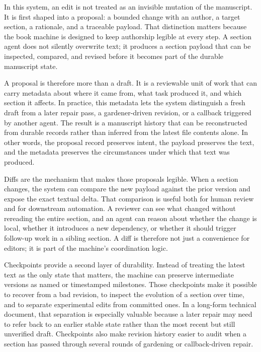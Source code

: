 In this system, an edit is not treated as an invisible mutation of the manuscript. It is first shaped into a proposal: a bounded change with an author, a target section, a rationale, and a traceable payload. That distinction matters because the book machine is designed to keep authorship legible at every step. A section agent does not silently overwrite text; it produces a section payload that can be inspected, compared, and revised before it becomes part of the durable manuscript state.

A proposal is therefore more than a draft. It is a reviewable unit of work that can carry metadata about where it came from, what task produced it, and which section it affects. In practice, this metadata lets the system distinguish a fresh draft from a later repair pass, a gardener-driven revision, or a callback triggered by another agent. The result is a manuscript history that can be reconstructed from durable records rather than inferred from the latest file contents alone. In other words, the proposal record preserves intent, the payload preserves the text, and the metadata preserves the circumstances under which that text was produced.

Diffs are the mechanism that makes those proposals legible. When a section changes, the system can compare the new payload against the prior version and expose the exact textual delta. That comparison is useful both for human review and for downstream automation. A reviewer can see what changed without rereading the entire section, and an agent can reason about whether the change is local, whether it introduces a new dependency, or whether it should trigger follow-up work in a sibling section. A diff is therefore not just a convenience for editors; it is part of the machine's coordination logic.

Checkpoints provide a second layer of durability. Instead of treating the latest text as the only state that matters, the machine can preserve intermediate versions as named or timestamped milestones. Those checkpoints make it possible to recover from a bad revision, to inspect the evolution of a section over time, and to separate experimental edits from committed ones. In a long-form technical document, that separation is especially valuable because a later repair may need to refer back to an earlier stable state rather than the most recent but still unverified draft. Checkpoints also make revision history easier to audit when a section has passed through several rounds of gardening or callback-driven repair.

